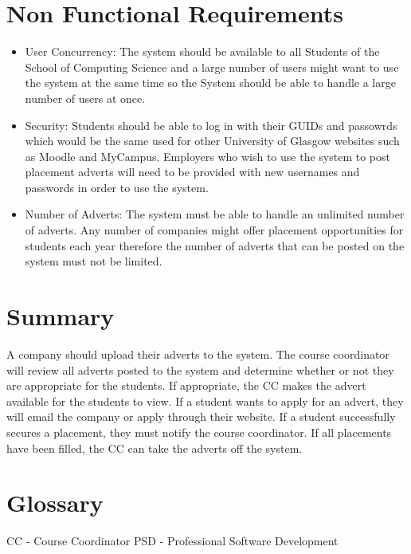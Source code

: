 \documentclass{l3deliverable}
\begin{document}
\section{Non Functional Requirements}

\begin{itemize}
\item User Concurrency: The system should be available to all Students of the School of Computing Science and a large number of users might want to use the system at the same time so the System should be able to handle a large number of users at once.
\item Security: Students should be able to log in with their GUIDs and passowrds which would be the same used for other University of Glasgow websites such as Moodle and MyCampus. Employers who wish to use the system to post placement adverts will need to be provided with new usernames and passwords in order to use the system.
\item Number of Adverts: The system must be able to handle an unlimited number of adverts. Any number of companies might offer placement opportunities for students each year therefore the number of adverts that can be posted on the system must not be limited.
\end{itemize}

\section{Summary}

A company should upload their adverts to the system. The course coordinator will review
all adverts posted to the system and determine whether or not they are appropriate for the
students. If appropriate, the CC makes the advert available for the students to view. If a student
wants to apply for an advert, they will email the company or apply through their website. If
a student successfully secures a placement, they must notify the course coordinator. If all
placements have been filled, the CC can take the adverts off the system.

\appendix

\section{Glossary}
CC - Course Coordinator
PSD - Professional Software Development
\end{document}
